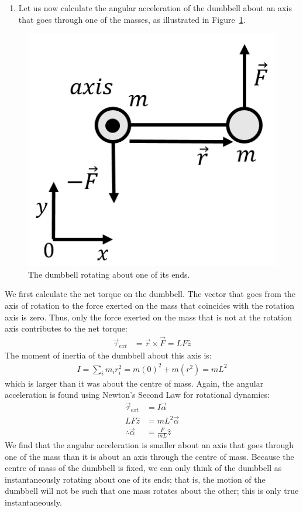 \begin{framed}
\begin{framed}
\begin{enumerate}[resume]
\item Let us now calculate the angular acceleration of the dumbbell about an axis that goes through one of the masses, as illustrated in Figure~\ref{fig:rotationaldynamics:dumbbell_end}.
\end{enumerate}

\begin{figure}[!htbp]
\centering
\includegraphics[width=0.375\linewidth]{files/dumbbell_end-097a7e42ada9c2384cb2da98c2b5790a.png}
\caption[]{The dumbbell rotating about one of its ends.}
\label{fig:rotationaldynamics:dumbbell_end}
\end{figure}

We first calculate the net torque on the dumbbell. The vector that goes from the axis of rotation to the force exerted on the mass that coincides with the rotation axis is zero. Thus, only the force exerted on the mass that is not at the rotation axis contributes to the net torque:
\begin{align*}
\vec\tau_{ext}&= \vec r \times \vec F = LF\hat z
\end{align*}
The moment of inertia of the dumbbell about this axis is:
\begin{align*}
I = \sum_i  m_ir_i^2 = m(0)^2 + m(r^2) = mL^2
\end{align*}
which is larger than it was about the centre of mass. Again, the angular acceleration is found using Newton's Second Law for rotational dynamics:
\begin{align*}
\vec\tau_{ext}&= I\vec\alpha\\
LF\hat z&=mL^2\vec\alpha\\
\therefore \vec\alpha &= \frac{F}{mL}\hat z
\end{align*}
We find that the angular acceleration is smaller about an axis that goes through one of the mass than it is about an axis through the centre of mass. Because the centre of mass of the dumbbell is fixed, we can only think of the dumbbell as instantaneously rotating about one of its ends; that is, the motion of the dumbbell will not be such that one mass rotates about the other; this is only true instantaneously.


\end{framed}
\end{framed}
